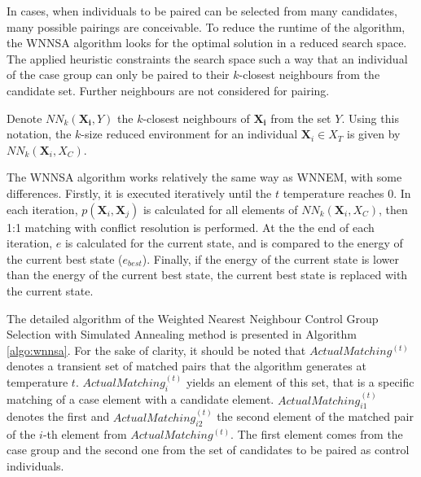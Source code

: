 		In cases, when individuals to be paired can be selected from many candidates, many possible pairings are conceivable. To reduce the runtime of the algorithm, the WNNSA algorithm looks for the optimal solution in a reduced search space. The applied heuristic constraints the search space such a way that an individual of the case group can only be paired to their $k$-closest neighbours from the candidate set. Further neighbours are not considered for pairing.
										
		Denote $NN_k(\mathbf{X_i},Y)$ the $k$-closest neighbours of $\mathbf{X_i}$ from the set $Y$. Using this notation, the $k$-size reduced environment for an individual $\mathbf{X}_i \in X_T$ is given by $NN_k (\mathbf{X}_i,X_C)$.  
				
		The WNNSA algorithm works relatively the same way as WNNEM, with some differences. Firstly, it is executed iteratively until the $t$ temperature reaches $0$. In each iteration, $p(\textbf{X}_i,\textbf{X}_j)$ is calculated for all elements of $NN_k(\textbf{X}_i, X_C)$, then 1:1 matching with conflict resolution is performed. At the the end of each iteration, $e$ is calculated for the current state, and is compared to the energy of the current best state ($e_{best}$). Finally, if the energy of the current state is lower than the energy of the current best state, the current best state is replaced with the current state.
				    
		The detailed algorithm of the Weighted Nearest Neighbour Control Group Selection with Simulated Annealing method is presented in Algorithm \ref{algo:wnnsa}. For the sake of clarity, it should be noted that $ActualMatching^{(t)}$ denotes a transient set of matched pairs that the algorithm generates at temperature $t$. $ActualMatching_i^{(t)}$ yields an element of this set, that is a specific matching of a case element with a candidate element. $ActualMatching_{i1}^{(t)}$ denotes the first and $ActualMatching_{i2}^{(t)}$ the second element of the matched pair of the $i$-th element from $ActualMatching^{(t)}$. The first element comes from the case group and the second one from the set of candidates to be paired as control individuals. 
										
